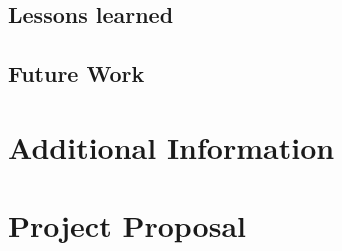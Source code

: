 \documentclass[12pt,a4paper,twoside,openright]{report} \usepackage[pdfborder={0 0 0}]{hyperref}    %
\theoremstyle{definition} \newtheorem{definition}{Definition}[section]
\begin{document}
      \section{Lessons learned}

      \section{Future Work}




      \nocite{*}
      



      \appendix

      \chapter{Additional Information}

%
%
%
%
%


      \chapter{Project Proposal} \label{chap:proposal} 

        
\end{document}
